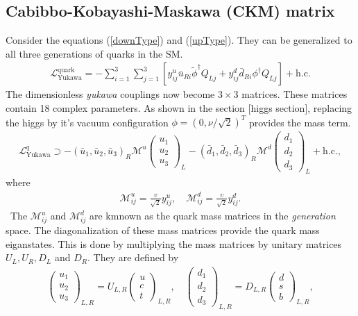 \subsection{Cabibbo-Kobayashi-Maskawa (CKM) matrix}  
Consider the equations (\ref{downType}) and (\ref{upType}). They can be generalized to all three generations of quarks in the SM.
\begin{eqnarray}
\mathcal{L}_{\mathrm{Yukawa}}^{\text{quark}}=-\sum_{i=1}^{3} \sum_{j=1}^{3}\left[y_{i j}^{u} \bar{u}_{R i} \tilde{\phi}^{\dagger} Q_{L j}+y_{i j}^{d} \bar{d}_{R i} \phi^{\dagger} Q_{L j}\right]+\mathrm{h.c.}
\end{eqnarray}
The dimensionless \textit{yukawa} couplings now become $3\times3$ matrices. These matrices contain 18 complex parameters. As shown in the section [higgs section], replacing the higgs by it's vacuum configuration $\phi=(0, \nu/\sqrt{2})^T$ provides the mass term. 
\begin{eqnarray}
\mathcal{L}_{\mathrm{Yukawa}}^{q} \supset-\left(\bar{u}_{1}, \bar{u}_{2}, \bar{u}_{3}\right)_{R} \mathcal{M}^{u}\left(\begin{array}{c}{u_{1}} \\ {u_{2}} \\ {u_{3}}\end{array}\right)_{L}-\left(\bar{d}_{1}, \bar{d}_{2}, \bar{d}_{3}\right)_{R} \mathcal{M}^{d}\left(\begin{array}{c}{d_{1}} \\ {d_{2}} \\ {d_{3}}\end{array}\right)_{L}+\mathrm{h.c.},
\end{eqnarray}
where 
\begin{eqnarray}
\mathcal{M}_{i j}^{u}=\frac{v}{\sqrt{2}} y_{i j}^{u}, \quad \mathcal{M}_{i j}^{d}=\frac{v}{\sqrt{2}} y_{i j}^{d}.
\end{eqnarray}\
The $\mathcal{M}_{i j}^{u}$ and $\mathcal{M}_{i j}^{d}$ are kmnown as the quark mass matrices in the \textit{generation} space. The diagonalization of these mass matrices provide the quark mass eiganstates. This is done by multiplying the mass matrices by unitary matrices $U_{L}, U_{R}, D_{L}$ and $D_{R}$. They are defined by
\begin{eqnarray}
\left(\begin{array}{c}{u_{1}} \\ {u_{2}} \\ {u_{3}}\end{array}\right)_{L, R}=U_{L, R}\left(\begin{array}{c}{u} \\ {c} \\ {t}\end{array}\right)_{L, R}, \quad\left(\begin{array}{c}{d_{1}} \\ {d_{2}} \\ {d_{3}}\end{array}\right)_{L, R}=D_{L, R}\left(\begin{array}{c}{d} \\ {s} \\ {b}\end{array}\right)_{L, R},
\end{eqnarray}
